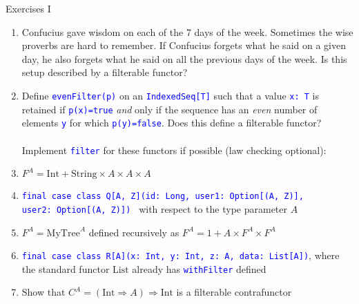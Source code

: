 \documentclass[english]{beamer}
\begin{document}
\begin{frame}{Exercises I}
\begin{enumerate}
\item Confucius gave wisdom on each of the 7 days of the week. Sometimes
the wise proverbs are hard to remember. If Confucius forgets what
he said on a given day, he also forgets what he said on all the previous
days of the week. Is this setup described by a filterable functor?
\item Define \texttt{\textcolor{blue}{\footnotesize{}evenFilter(p)}} on
an \texttt{\textcolor{blue}{\footnotesize{}IndexedSeq{[}T{]}}} such
that a value \texttt{\textcolor{blue}{\footnotesize{}x:\ T}} is retained
if \texttt{\textcolor{blue}{\footnotesize{}p(x)=true}} \emph{and}
only if the sequence has an \emph{even} number of elements \texttt{\textcolor{blue}{\footnotesize{}y}}
for which \texttt{\textcolor{blue}{\footnotesize{}p(y)=false}}. Does
this define a filterable functor?\\
\ \\
Implement \texttt{\textcolor{blue}{\footnotesize{}filter}} for these
functors if possible (law checking optional):
\item $F^{A}=\text{Int}+\text{String}\times A\times A\times A$
\item \texttt{\textcolor{blue}{\footnotesize{}final case class Q{[}A, Z{]}(id:\ Long,
user1:\ Option{[}(A, Z){]}, user2:\ Option{[}(A, Z){]}) }}\textendash{}
with respect to the type parameter $A$
\item $F^{A}=\text{MyTree}^{A}$ defined recursively as $F^{A}=1+A\times F^{A}\times F^{A}$
\item \texttt{\textcolor{blue}{\footnotesize{}final case class R{[}A{]}(x:\ Int,\ y: Int,
z:\ A, data:\ List{[}A{]})}}, where the standard functor $\text{List}$
already has \texttt{\textcolor{blue}{\footnotesize{}withFilter}} defined
\item Show that $C^{A}=(\text{Int}\Rightarrow A)\Rightarrow\text{Int}$
is a filterable contrafunctor
\end{enumerate}
\end{frame}
\end{document}
